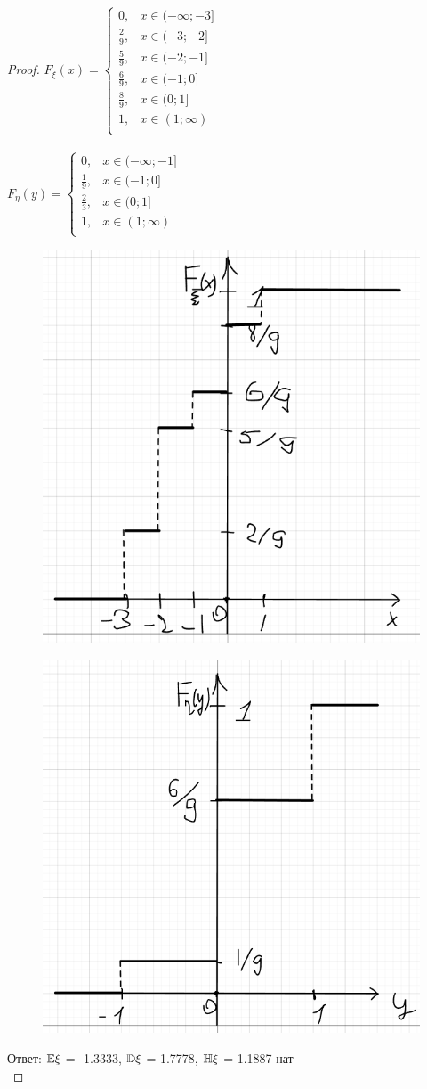 \begin{proof}
$F_{\xi}(x) = \begin{cases} 
          0, & x\in (-\infty; -3] \\
          \frac{2}{9}, & x\in (-3; -2] \\
          \frac{5}{9}, & x\in (-2; -1] \\
          \frac{6}{9}, & x\in (-1; 0] \\
          \frac{8}{9}, & x\in (0; 1] \\
          1, & x\in (1; \infty) \\
       \end{cases}$\\
       \\
$F_{\eta}(y) = \begin{cases} 
          0, & x\in (-\infty; -1] \\
          \frac{1}{9}, & x\in (-1; 0] \\
          \frac{2}{3}, & x\in (0; 1] \\
          1, & x\in (1; \infty) \\
       \end{cases}$


\begin{figure}[H]
    \centering
    \includegraphics[width=0.5\linewidth]{2idz_1.png}
    \caption{}
\end{figure}
\begin{figure}[H]
    \centering
    \includegraphics[width=0.5\linewidth]{2idz_2.png}
    \caption{}
\end{figure}

Ответ: $\mathbb E\xi$ = -1.3333, $\mathbb D\xi$ = 1.7778, $\mathbb H\xi$ = 1.1887 нат\\

\end{proof}

